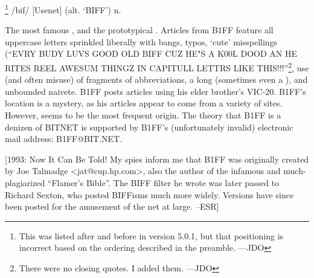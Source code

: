 \footnote{This was listed after  and
before  in version 5.0.1, but that positioning is incorrect based
on the ordering described in the preamble. ---JDO} /bif/ [Usenet] (alt. `BIFF')
n.

The most famous , and the prototypical .
Articles from B1FF feature all uppercase letters sprinkled liberally with bangs,
typos, `cute' misspellings (``EVRY BUDY LUVS GOOD OLD BIFF CUZ HE"S A K00L DOOD
AN HE RITES REEL AWESUM THINGZ IN CAPITULL LETTRS LIKE THIS!!!''\footnote{There
were no closing quotes. I added them. ---JDO}, use (and often misuse) of
fragments of  abbreviations, a long 
(sometimes even a ), and unbounded naivete. B1FF posts
articles using his elder brother's VIC-20. B1FF's location is a mystery, as his
articles appear to come from a variety of sites. However, 
seems to be the most frequent origin. The theory that B1FF is a denizen of
BITNET is supported by B1FF's (unfortunately invalid) electronic mail address:
B1FF@BIT.NET.

[1993: Now It Can Be Told! My spies inform me that B1FF was originally created
by Joe Talmadge <jat@cup.hp.com>, also the author of the infamous and
much-plagiarized ``Flamer's Bible''. The BIFF filter he wrote was later passed
to Richard Sexton, who posted BIFFisms much more widely. Versions have since
been posted for the amusement of the net at large. --ESR]

